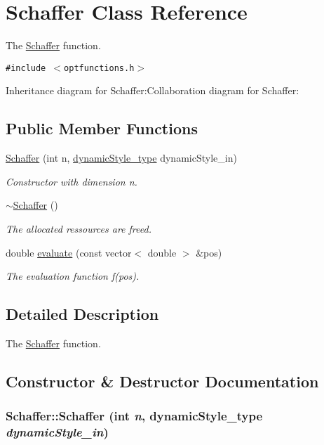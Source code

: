 \hypertarget{classSchaffer}{
\section{Schaffer Class Reference}
\label{classSchaffer}
}
The \hyperlink{classSchaffer}{Schaffer} function.  


{\tt \#include $<$optfunctions.h$>$}

Inheritance diagram for Schaffer:Collaboration diagram for Schaffer:\subsection*{Public Member Functions}
\begin{CompactItemize}
\item 
\hyperlink{classSchaffer_d3b1f4389538d9d2eda2781b75aba948}{Schaffer} (int n, \hyperlink{optfunctions_8h_ae9aa3a5dd199a43e77abc2cccf4477e}{dynamicStyle\_\-type} dynamicStyle\_\-in)
\begin{CompactList}\small\item\em Constructor with dimension n. \item\end{CompactList}\item 
\hyperlink{classSchaffer_afa81a2b57a56c9b225f04fe80fccd19}{$\sim$Schaffer} ()
\begin{CompactList}\small\item\em The allocated ressources are freed. \item\end{CompactList}\item 
double \hyperlink{classSchaffer_7112daf77ee0a64dab7c86de90a534dd}{evaluate} (const vector$<$ double $>$ \&pos)
\begin{CompactList}\small\item\em The evaluation function f(pos). \item\end{CompactList}\end{CompactItemize}


\subsection{Detailed Description}
The \hyperlink{classSchaffer}{Schaffer} function. 

\subsection{Constructor \& Destructor Documentation}
\hypertarget{classSchaffer_d3b1f4389538d9d2eda2781b75aba948}{
\subsubsection{\setlength{\rightskip}{0pt plus 5cm}Schaffer::Schaffer (int {\em n}, \/  {\bf dynamicStyle\_\-type} {\em dynamicStyle\_\-in})}}
\label{classSchaffer_d3b1f4389538d9d2eda2781b75aba948}


